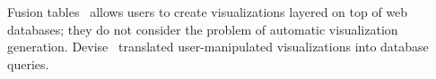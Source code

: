 Fusion tables~\cite{DBLP:conf/sigmod/GonzalezHJLMSSG10} allows users to create
visualizations layered on top of web databases; they do not consider the problem
of automatic visualization generation.
Devise~\cite{DBLP:conf/sigmod/LivnyRBCDLMW97} translated user-manipulated
visualizations into database queries.